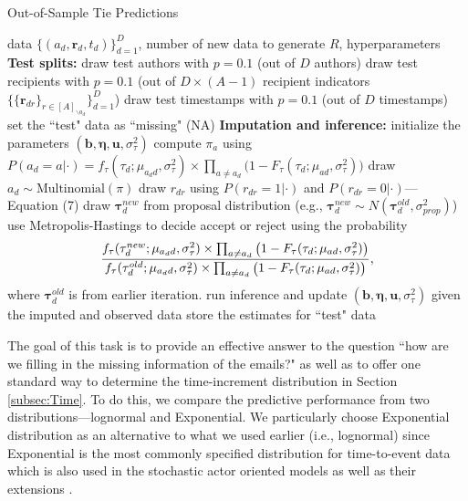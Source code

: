 \documentclass[12pt]{article}
\begin{document}
	\begin{algorithm}[!t]
		\caption{Out-of-Sample Tie Predictions}
		\label{alg:PPE}
		\begin{algorithmic}
			 data $ \{ (a_d, \boldsymbol{r}_d, t_d)\}_{d=1}^D$, 
			number of new data to generate $R$,
			hyperparameters
			\vskip 0.1in
			\textbf{Test splits:}	
			\STATE draw test authors with $p=0.1$ (out of $D$ authors) 
			\STATE draw test recipients
			with $p=0.1$ (out of $D\times (A-1)$ recipient indicators $\{\{\boldsymbol{r}_{dr}\}_{r\in [A]_{\backslash a_d}}\}_{d=1}^D$)
			\STATE draw test timestamps with $p=0.1$  (out of $D$ timestamps) 
			\STATE set the ``test" data as ``missing" (NA)
			\vskip 0.1in
			\textbf{Imputation and inference:}	
			\STATE initialize the parameters $(\boldsymbol{b}, \boldsymbol{\eta}, \boldsymbol{u}, \sigma^2_\tau)$
			\STATE compute $\pi_{a} $ using $P(a_d= a | \cdot)=f_{\tau}(\tau_{d}; \mu_{a_dd}, \sigma_\tau^2)\times \prod_{a\neq a_d}\big(1-F_{\tau}(\tau_{d}; \mu_{a d}, \sigma_\tau^2) \big)$
			\ENDFOR
			\STATE draw $a_d \sim \mbox{Multinomial}(\pi)$
			\ENDIF
			\STATE draw $r_{dr}$ using $P(r_{dr}= 1 | \cdot)$ and $P(r_{dr}= 0| \cdot)$---Equation (7)
			\ENDIF
			\ENDFOR
			\STATE draw $\boldsymbol{\tau}^{new}_d$ from proposal distribution (e.g., $\boldsymbol{\tau}^{new}_d \sim N(\boldsymbol{\tau}^{old}_d, \sigma^2_{prop})$)
			\STATE use Metropolis-Hastings to decide accept or reject using the probability
			\begin{equation*}
			\footnotesize
			\frac{f_{\tau}(\tau^{new}_{d}; \mu_{a_d d}, \sigma_\tau^2)\times \prod_{a\neq a_d}\big(1-F_{\tau}(\tau_{d}; \mu_{a d}, \sigma_\tau^2) \big) }{f_{\tau}(\tau^{old}_{d}; \mu_{a_d d}, \sigma_\tau^2)\times \prod_{a\neq a_d}\big(1-F_{\tau}(\tau_{d}; \mu_{a d}, \sigma_\tau^2) \big)},
			\end{equation*}
			where $\boldsymbol{\tau}^{old}_d$ is from earlier iteration.
			\ENDIF
			\STATE run inference and update $(\boldsymbol{b}, \boldsymbol{\eta},\boldsymbol{u}, \sigma^2_\tau)$ given the imputed and observed data
			\ENDFOR
			\STATE store the estimates for ``test" data
			\ENDFOR
		\end{algorithmic}
	\end{algorithm}
	
The goal of this task is to provide an effective answer to the question ``how are we filling in the missing information of the emails?" as well as to offer one standard way to determine the time-increment distribution in Section \ref{subsec:Time}. To do this, we compare the predictive performance from two distributions---lognormal and Exponential. We particularly choose Exponential distribution as an alternative to what we used earlier (i.e., lognormal) since Exponential is the most commonly specified distribution for time-to-event data which is also used in the stochastic actor oriented models \citep{snijders1996stochastic} as well as their extensions \citep{snijders2007modeling}.
\end{document}
